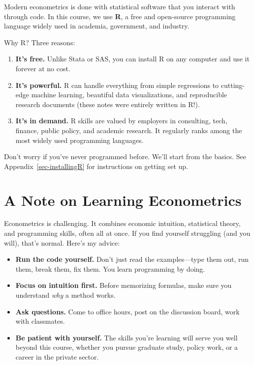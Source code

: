 \documentclass[
  letterpaper,
  DIV=11,
  numbers=noendperiod]{scrreprt}
\begin{document}

Modern econometrics is done with statistical software that you interact
with through code. In this course, we use \textbf{R}, a free and
open-source programming language widely used in academia, government,
and industry.

Why R? Three reasons:

\begin{enumerate}
\def\labelenumi{\arabic{enumi}.}
\item
  \textbf{It's free.} Unlike Stata or SAS, you can install R on any
  computer and use it forever at no cost.
\item
  \textbf{It's powerful.} R can handle everything from simple
  regressions to cutting-edge machine learning, beautiful data
  visualizations, and reproducible research documents (these notes were
  entirely written in R!).
\item
  \textbf{It's in demand.} R skills are valued by employers in
  consulting, tech, finance, public policy, and academic research. It
  regularly ranks among the most widely used programming languages.
\end{enumerate}

Don't worry if you've never programmed before. We'll start from the
basics. See Appendix~\ref{sec-installingR} for instructions on getting
set up.

\section*{A Note on Learning
Econometrics}\label{a-note-on-learning-econometrics}


Econometrics is challenging. It combines economic intuition, statistical
theory, and programming skills, often all at once. If you find yourself
struggling (and you will), that's normal. Here's my advice:

\begin{itemize}
\item
  \textbf{Run the code yourself.} Don't just read the examples---type
  them out, run them, break them, fix them. You learn programming by
  doing.
\item
  \textbf{Focus on intuition first.} Before memorizing formulas, make
  sure you understand \emph{why} a method works.
\item
  \textbf{Ask questions.} Come to office hours, post on the discussion
  board, work with classmates.
\item
  \textbf{Be patient with yourself.} The skills you're learning will
  serve you well beyond this course, whether you pursue graduate study,
  policy work, or a career in the private sector.
\end{itemize}
\end{document}

